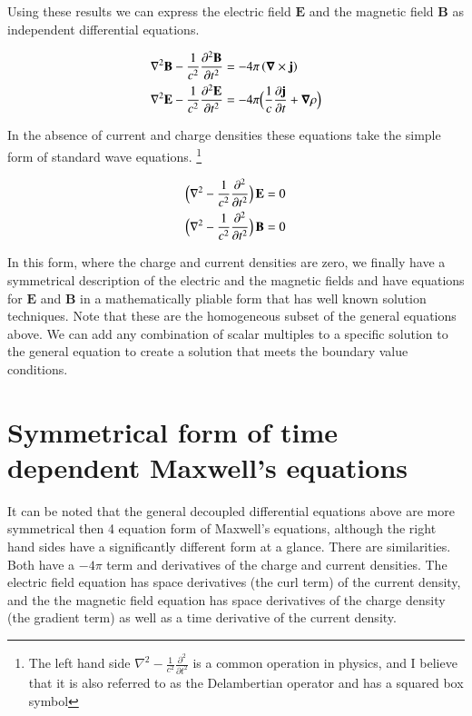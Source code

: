 \documentclass{article}      %
\newcommand{\grad}[0]{\boldsymbol{\nabla}}
\newcommand{\curl}[0]{\grad \times}
\newcommand{\delsquared}[0]{\nabla^2}
\newcommand{\D}[2] {\frac {\partial #2} {\partial #1}}
\newcommand{\Dsq}[2] {\frac {\partial^2 #2} {\partial {#1}^2}}
\newcommand{\Bj}[0]{\mathbf{j}}
\newcommand{\BB}[0]{\mathbf{B}}
\newcommand{\BE}[0]{\mathbf{E}}
\begin{document}
Using these results we can express the 
electric field $\BE$ and the
magnetic field $\BB$
as independent differential equations.

\begin{align*}
\delsquared \BB - \frac{1}{c^2} \Dsq{t}{\BB} &= - 4\pi \left(\curl \Bj\right) \\
\delsquared \BE - \frac{1}{c^2} \Dsq{t}{\BE} &= - 4\pi \Bigl(\frac{1}{c} \D{t}{\Bj} + \grad \rho\Bigr)
\end{align*}

In the absence of current and charge densities these equations take the simple form of standard wave
equations.
\footnote{
The left hand side 
$
\delsquared - \frac{1}{c^2}\Dsq{t}{}
$
is a common operation in physics, and I believe that 
it is also referred to as the Delambertian operator and has a squared box symbol
}

\begin{align*}
\Bigl(\delsquared - \frac{1}{c^2} \Dsq{t}{} \Bigr) \, \BE &= 0 \\
\Bigl(\delsquared - \frac{1}{c^2} \Dsq{t}{} \Bigr) \, \BB &= 0
\end{align*}

In this form, where the charge and current densities are zero, we finally have 
a symmetrical description of the electric and the magnetic fields and have equations 
for $\BE$ and $\BB$ in a mathematically pliable form that has well known 
solution techniques.
Note that these are the homogeneous subset of the general equations above.
We can add any combination of scalar multiples to a specific solution 
to the general equation to create a solution that meets the boundary 
value conditions.

\section{Symmetrical form of time dependent Maxwell's equations}

It can 
be noted that the general decoupled differential equations above are more 
symmetrical then 4 equation form of Maxwell's equations, although the
right hand sides have a significantly different form at a glance.  There
are similarities.  Both have a $-4\pi$ term and derivatives of the charge and
current densities.  The electric field equation has space derivatives (the curl term) of 
the current density, and the the magnetic field equation has space derivatives of 
the charge density (the gradient term) as well as a time derivative of the current
density.
\end{document}
